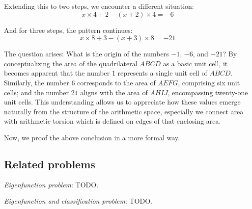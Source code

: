 Extending this to two steps, we encounter a different situation:
\begin{equation}
    x \times 4 + 2 - (x + 2) \times 4 = -6
\end{equation}

And for three steps, the pattern continues:
\begin{equation}
    x \times 8 + 3 - (x + 3) \times 8 = -21
\end{equation}

The question arises: What is the origin of the numbers $-1$, $-6$, and $-21$? By conceptualizing the area of the quadrilateral $ABCD$ as a basic unit cell,
it becomes apparent that the number $1$ represents a single unit cell of $ABCD$.
Similarly, the number $6$ corresponds to the area of $AEFG$, comprising six unit cells;
and the number $21$ aligns with the area of $AHIJ$, encompassing twenty-one unit cells.
This understanding allows us to appreciate how these values emerge naturally from the structure of the arithmetic space,
especially we connect area with arithmetic torsion which is defined on edges of that enclosing area.

Now, we proof the above conclusion in a more formal way.

\subsection{Related problems}

\emph{Eigenfunction problem}: TODO.

\emph{Eigenfunction and classification problem}: TODO.

\newpage
